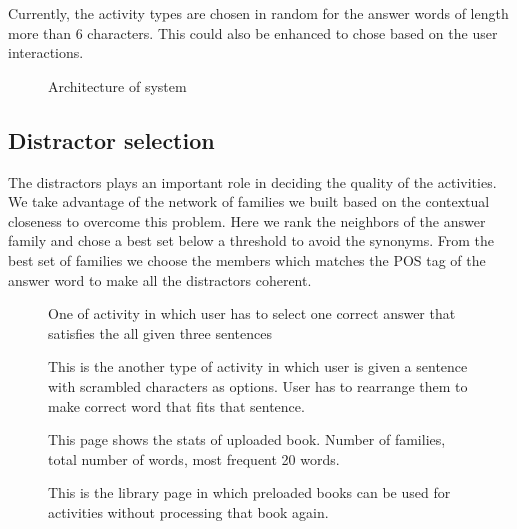 \documentclass[11pt,a4paper]{article}
\begin{document}
Currently, the activity types are chosen in random for the answer words of length
more than 6 characters. This could also be enhanced to chose based on the user
interactions.

\begin{figure}
\begin{tcbraster}[raster columns=1, enhanced, blankest]
\caption{Architecture of system}

\end{tcbraster}
\end{figure}

\subsection{Distractor selection}
The distractors plays an important role in deciding the quality of the activities.
We take advantage of the network of families we built based on the contextual
closeness to overcome this problem. Here we rank the neighbors of the
answer family and chose a best set below a threshold to avoid the synonyms. From
the best set of families we choose the members which matches the POS tag of the
answer word to make all the distractors coherent.



\begin{figure}
\begin{tcbraster}[raster columns=1, enhanced, blankest]
\caption{One of activity in which user has to select one correct answer that satisfies the all given three sentences}

\caption{This is the another type of activity in which user is given a sentence with scrambled characters as options. User has to rearrange them to make correct word that fits that sentence.}

\caption{This page shows the stats of uploaded book. Number of families, total number of words, most frequent 20 words.}


\caption{This is the library page in which preloaded books can be used for activities without processing that book again.}

\end{tcbraster}
\end{figure}
\end{document}
